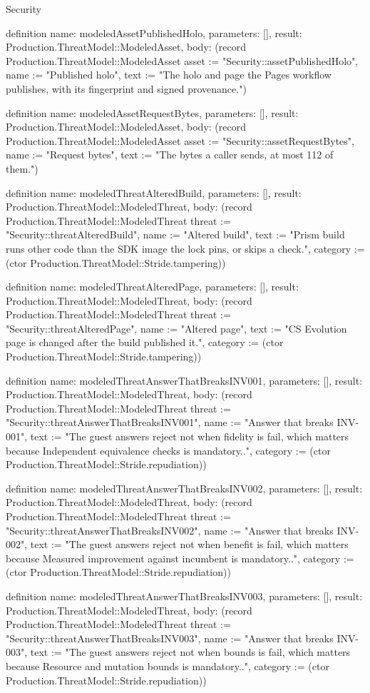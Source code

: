 \begin{lexlean}{Security}
\begin{semanticmodule}
definition{
  name: modeledAssetPublishedHolo,
  parameters: [],
  result: Production.ThreatModel::ModeledAsset,
  body: (record Production.ThreatModel::ModeledAsset {asset := "Security::assetPublishedHolo", name := "Published holo", text := "The holo and page the Pages workflow publishes, with its fingerprint and signed provenance."})
}

definition{
  name: modeledAssetRequestBytes,
  parameters: [],
  result: Production.ThreatModel::ModeledAsset,
  body: (record Production.ThreatModel::ModeledAsset {asset := "Security::assetRequestBytes", name := "Request bytes", text := "The bytes a caller sends, at most 112 of them."})
}

definition{
  name: modeledThreatAlteredBuild,
  parameters: [],
  result: Production.ThreatModel::ModeledThreat,
  body: (record Production.ThreatModel::ModeledThreat {threat := "Security::threatAlteredBuild", name := "Altered build", text := "Prism build runs other code than the SDK image the lock pins, or skips a check.", category := (ctor Production.ThreatModel::Stride.tampering)})
}

definition{
  name: modeledThreatAlteredPage,
  parameters: [],
  result: Production.ThreatModel::ModeledThreat,
  body: (record Production.ThreatModel::ModeledThreat {threat := "Security::threatAlteredPage", name := "Altered page", text := "CS Evolution page is changed after the build published it.", category := (ctor Production.ThreatModel::Stride.tampering)})
}

definition{
  name: modeledThreatAnswerThatBreaksINV001,
  parameters: [],
  result: Production.ThreatModel::ModeledThreat,
  body: (record Production.ThreatModel::ModeledThreat {threat := "Security::threatAnswerThatBreaksINV001", name := "Answer that breaks INV-001", text := "The guest answers reject not when fidelity is fail, which matters because Independent equivalence checks is mandatory..", category := (ctor Production.ThreatModel::Stride.repudiation)})
}

definition{
  name: modeledThreatAnswerThatBreaksINV002,
  parameters: [],
  result: Production.ThreatModel::ModeledThreat,
  body: (record Production.ThreatModel::ModeledThreat {threat := "Security::threatAnswerThatBreaksINV002", name := "Answer that breaks INV-002", text := "The guest answers reject not when benefit is fail, which matters because Measured improvement against incumbent is mandatory..", category := (ctor Production.ThreatModel::Stride.repudiation)})
}

definition{
  name: modeledThreatAnswerThatBreaksINV003,
  parameters: [],
  result: Production.ThreatModel::ModeledThreat,
  body: (record Production.ThreatModel::ModeledThreat {threat := "Security::threatAnswerThatBreaksINV003", name := "Answer that breaks INV-003", text := "The guest answers reject not when bounds is fail, which matters because Resource and mutation bounds is mandatory..", category := (ctor Production.ThreatModel::Stride.repudiation)})
}


\end{semanticmodule}
\end{lexlean}
